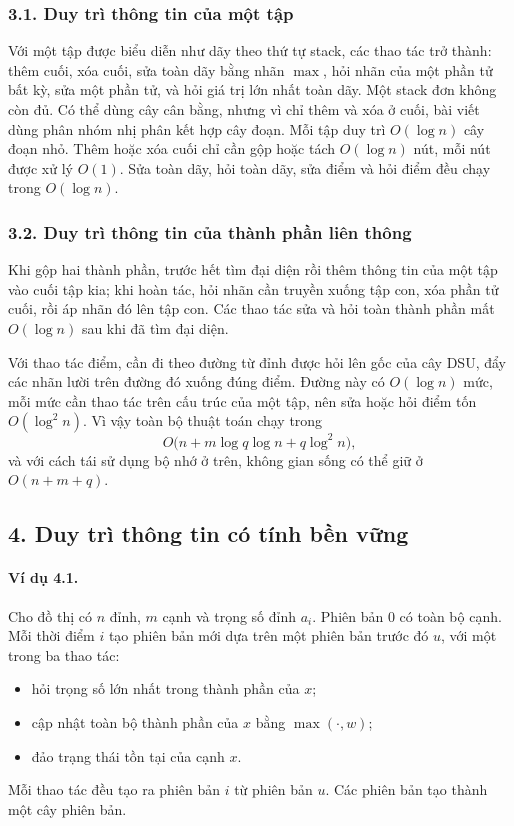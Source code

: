 \documentclass[11pt]{article}
\begin{document}
\subsubsection*{3.1. Duy trì thông tin của một tập}

Với một tập được biểu diễn như dãy theo thứ tự stack, các thao tác trở thành:
thêm cuối, xóa cuối, sửa toàn dãy bằng nhãn \(\max\), hỏi nhãn của một phần tử
bất kỳ, sửa một phần tử, và hỏi giá trị lớn nhất toàn dãy. Một stack đơn không
còn đủ. Có thể dùng cây cân bằng, nhưng vì chỉ thêm và xóa ở cuối, bài viết
dùng phân nhóm nhị phân kết hợp cây đoạn. Mỗi tập duy trì \(O(\log n)\) cây
đoạn nhỏ. Thêm hoặc xóa cuối chỉ cần gộp hoặc tách \(O(\log n)\) nút, mỗi nút
được xử lý \(O(1)\). Sửa toàn dãy, hỏi toàn dãy, sửa điểm và hỏi điểm đều chạy
trong \(O(\log n)\).

\subsubsection*{3.2. Duy trì thông tin của thành phần liên thông}

Khi gộp hai thành phần, trước hết tìm đại diện rồi thêm thông tin của một tập
vào cuối tập kia; khi hoàn tác, hỏi nhãn cần truyền xuống tập con, xóa phần tử
cuối, rồi áp nhãn đó lên tập con. Các thao tác sửa và hỏi toàn thành phần mất
\(O(\log n)\) sau khi đã tìm đại diện.

Với thao tác điểm, cần đi theo đường từ đỉnh được hỏi lên gốc của cây DSU, đẩy
các nhãn lười trên đường đó xuống đúng điểm. Đường này có \(O(\log n)\) mức,
mỗi mức cần thao tác trên cấu trúc của một tập, nên sửa hoặc hỏi điểm tốn
\(O(\log^2 n)\). Vì vậy toàn bộ thuật toán chạy trong
\[
  O\bigl(n+m\log q\log n+q\log^2 n\bigr),
\]
và với cách tái sử dụng bộ nhớ ở trên, không gian sống có thể giữ ở
\(O(n+m+q)\).

\subsection*{4. Duy trì thông tin có tính bền vững}

\paragraph{Ví dụ 4.1.}
Cho đồ thị có \(n\) đỉnh, \(m\) cạnh và trọng số đỉnh \(a_i\). Phiên bản \(0\)
có toàn bộ cạnh. Mỗi thời điểm \(i\) tạo phiên bản mới dựa trên một phiên bản
trước đó \(u\), với một trong ba thao tác:
\begin{itemize}
  \item hỏi trọng số lớn nhất trong thành phần của \(x\);
  \item cập nhật toàn bộ thành phần của \(x\) bằng \(\max(\cdot,w)\);
  \item đảo trạng thái tồn tại của cạnh \(x\).
\end{itemize}
Mỗi thao tác đều tạo ra phiên bản \(i\) từ phiên bản \(u\). Các phiên bản tạo
thành một cây phiên bản.
\end{document}
